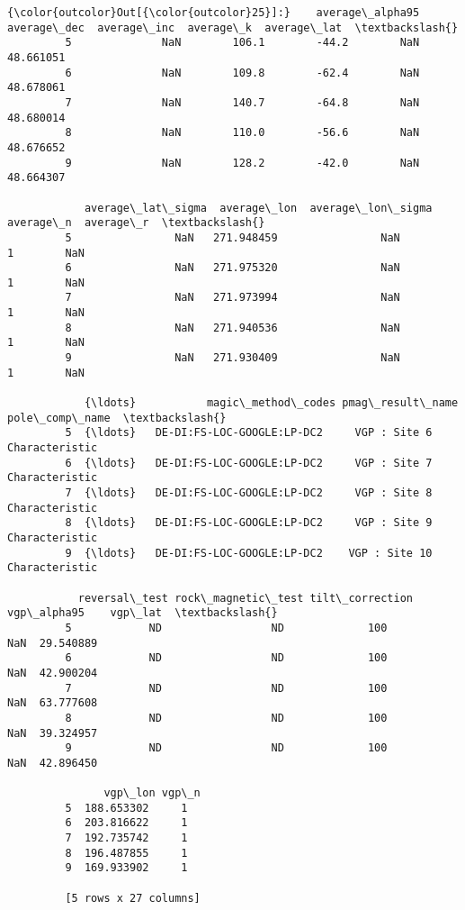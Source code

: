 \documentclass{article}
\begin{document}
            \begin{Verbatim}[commandchars=\\\{\}]
{\color{outcolor}Out[{\color{outcolor}25}]:}    average\_alpha95  average\_dec  average\_inc  average\_k  average\_lat  \textbackslash{}
         5              NaN        106.1        -44.2        NaN    48.661051   
         6              NaN        109.8        -62.4        NaN    48.678061   
         7              NaN        140.7        -64.8        NaN    48.680014   
         8              NaN        110.0        -56.6        NaN    48.676652   
         9              NaN        128.2        -42.0        NaN    48.664307   
         
            average\_lat\_sigma  average\_lon  average\_lon\_sigma  average\_n  average\_r  \textbackslash{}
         5                NaN   271.948459                NaN          1        NaN   
         6                NaN   271.975320                NaN          1        NaN   
         7                NaN   271.973994                NaN          1        NaN   
         8                NaN   271.940536                NaN          1        NaN   
         9                NaN   271.930409                NaN          1        NaN   
         
            {\ldots}           magic\_method\_codes pmag\_result\_name  pole\_comp\_name  \textbackslash{}
         5  {\ldots}   DE-DI:FS-LOC-GOOGLE:LP-DC2     VGP : Site 6  Characteristic   
         6  {\ldots}   DE-DI:FS-LOC-GOOGLE:LP-DC2     VGP : Site 7  Characteristic   
         7  {\ldots}   DE-DI:FS-LOC-GOOGLE:LP-DC2     VGP : Site 8  Characteristic   
         8  {\ldots}   DE-DI:FS-LOC-GOOGLE:LP-DC2     VGP : Site 9  Characteristic   
         9  {\ldots}   DE-DI:FS-LOC-GOOGLE:LP-DC2    VGP : Site 10  Characteristic   
         
           reversal\_test rock\_magnetic\_test tilt\_correction vgp\_alpha95    vgp\_lat  \textbackslash{}
         5            ND                 ND             100         NaN  29.540889   
         6            ND                 ND             100         NaN  42.900204   
         7            ND                 ND             100         NaN  63.777608   
         8            ND                 ND             100         NaN  39.324957   
         9            ND                 ND             100         NaN  42.896450   
         
               vgp\_lon vgp\_n  
         5  188.653302     1  
         6  203.816622     1  
         7  192.735742     1  
         8  196.487855     1  
         9  169.933902     1  
         
         [5 rows x 27 columns]
\end{Verbatim}
        
\end{document}
